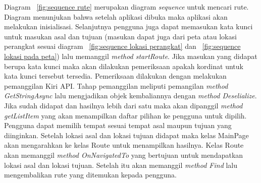 \hspace{0.5cm} Diagram ~\ref{fig:sequence rute} merupakan diagram \textit{sequence} untuk mencari rute. Diagram menunjukan bahwa setelah aplikasi dibuka maka aplikasi akan melakukan inisialisasi. Selanjutnya pengguna juga dapat memasukan kata kunci untuk masukan asal dan tujuan (masukan dapat juga dari peta atau lokasi perangkat sesuai diagram ~\ref{fig:sequence lokasi perangkat} dan ~\ref{fig:sequence lokasi pada peta}) lalu memanggil \textit{method startRoute}. Jika masukan yang didapat berupa kata kunci maka akan dilakukan pemeriksaan apakah kordinat untuk kata kunci tersebut tersedia. Pemeriksaan dilakukan dengan melakukan pemanggilan Kiri API. Tahap pemanggilan meliputi pemangilan \textit{method GetStringAsync} lalu mengjadikan objek kembaliannya dengan \textit{method Deselialize}. Jika sudah didapat dan hasilnya lebih dari satu maka akan dipanggil \textit{method getListItem} yang akan menampilkan daftar pilihan ke pengguna untuk dipilih. Pengguna dapat memilih tempat sesuai tempat asal maupun tujuan yang diinginkan. Setelah lokasi asal dan lokasi tujuan didapat maka kelas MainPage akan mengarahkan ke kelas Route untuk menampilkan hasilnya. Kelas Route akan memanggil \textit{method OnNavigatedTo} yang bertujuan untuk mendapatkan lokasi asal dan lokasi tujuan. Setelah itu akan memanggil \textit{method Find} lalu mengembalikan rute yang ditemukan kepada pengguna.

\newpage

